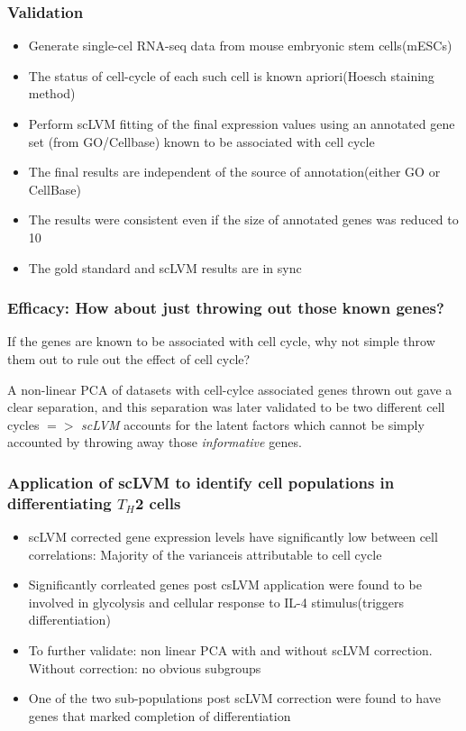 \documentclass[10pt, compress]{beamer}
\renewcommand{\(}{\begin{columns}}
\renewcommand{\)}{\end{columns}}
\newcommand{\<}[1]{\begin{column}{#1}}
\renewcommand{\>}{\end{column}}
\begin{document}
\begin{frame}
\frametitle{Validation}
\begin{itemize}[<+- | alert@+>]
\item Generate single-cel RNA-seq data from mouse embryonic stem cells(mESCs)
\item The status of cell-cycle of each such cell is known apriori(Hoesch staining method)
\item Perform scLVM fitting of the final expression values using an annotated gene set (from GO/Cellbase) known to be associated
with cell cycle
\item The final results are independent of the source of annotation(either GO or CellBase)
\item The results were consistent even if the size of annotated genes was reduced to 10
\item The gold standard and scLVM results are in sync
\end{itemize}
\end{frame}

\begin{frame}
\frametitle{Efficacy: How about just throwing out those known genes?}
If the genes are known to be associated with cell cycle, why not simple throw them out to rule out the 
effect of cell cycle?

A non-linear PCA of datasets with cell-cylce associated genes thrown out gave a clear separation, and this separation
was later validated to be two different cell cycles $=>$ \textit{scLVM} accounts for the latent factors which
cannot be simply accounted by throwing away those \textit{informative} genes.

\end{frame}

\begin{frame}
\frametitle{Application of scLVM to identify cell populations in differentiating $T_H$2 cells}

\begin{itemize}[<+- | alert@+>]
\item scLVM corrected gene expression levels have significantly low between cell correlations: Majority of the varianceis attributable to cell cycle
\item Significantly corrleated genes post csLVM application were found to be involved in glycolysis and cellular response to IL-4 stimulus(triggers differentiation)
\item To further validate: non linear PCA with and without scLVM correction. Without correction: no obvious subgroups
\item One of the two sub-populations post scLVM correction were found to have genes that marked completion of differentiation

\end{itemize}
\end{frame}
\end{document}
